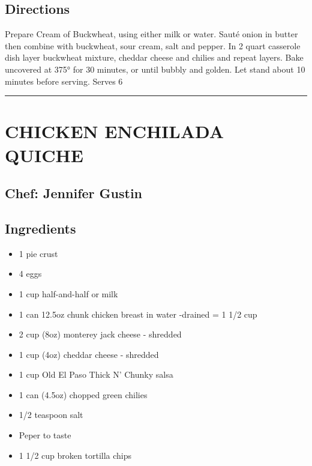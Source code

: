 \documentclass[
]{book}
\providecommand{\tightlist}{%
  \setlength{\itemsep}{0pt}\setlength{\parskip}{0pt}}
\begin{document}
\hypertarget{directions-47}{%
\subsection*{Directions}\label{directions-47}}


Prepare Cream of Buckwheat, using either milk or water. Sauté onion in butter then combine
with buckwheat, sour cream, salt and pepper. In 2 quart casserole dish layer buckwheat mixture,
cheddar cheese and chilies and repeat layers. Bake uncovered at 375° for 30 minutes,
or until bubbly and golden. Let stand about 10 minutes before serving. Serves 6

\begin{center}\rule{0.5\linewidth}{0.5pt}\end{center}

\hypertarget{chicken-enchilada-quiche}{%
\section*{CHICKEN ENCHILADA QUICHE}\label{chicken-enchilada-quiche}}


\hypertarget{chef-jennifer-gustin-8}{%
\subsection*{Chef: Jennifer Gustin}\label{chef-jennifer-gustin-8}}


\hypertarget{ingredients-48}{%
\subsection*{Ingredients}\label{ingredients-48}}


\begin{itemize}
\tightlist
\item
  1 pie crust
\item
  4 eggs
\item
  1 cup half-and-half or milk
\item
  1 can 12.5oz chunk chicken breast in water -drained = 1 1/2 cup
\item
  2 cup (8oz) monterey jack cheese - shredded
\item
  1 cup (4oz) cheddar cheese - shredded
\item
  1 cup Old El Paso Thick N' Chunky salsa
\item
  1 can (4.5oz) chopped green chilies
\item
  1/2 teaspoon salt
\item
  Peper to taste
\item
  1 1/2 cup broken tortilla chips
\end{itemize}
\end{document}

